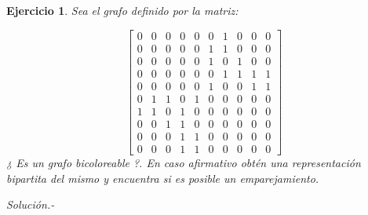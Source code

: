 \documentclass{amsart}
\newtheorem{ejer}[thm]{Ejercicio}
\begin{document}
\begin{ejer}
Sea el grafo definido por la matriz:

$$\left[
\begin{array}{cccccccccc}
0 & 0 & 0 & 0 & 0 & 0 & 1 & 0 & 0 & 0 \\
0 & 0 & 0 & 0 & 0 & 1 & 1 & 0 & 0 & 0 \\
0 & 0 & 0 & 0 & 0 & 1 & 0 & 1 & 0 & 0 \\
0 & 0 & 0 & 0 & 0 & 0 & 1 & 1 & 1 & 1 \\
0 & 0 & 0 & 0 & 0 & 1 & 0 & 0 & 1 & 1 \\
0 & 1 & 1 & 0 & 1 & 0 & 0 & 0 & 0 & 0 \\
1 & 1 & 0 & 1 & 0 & 0 & 0 & 0 & 0 & 0 \\
0 & 0 & 1 & 1 & 0 & 0 & 0 & 0 & 0 & 0 \\
0 & 0 & 0 & 1 & 1 & 0 & 0 & 0 & 0 & 0 \\
0 & 0 & 0 & 1 & 1 & 0 & 0 & 0 & 0 & 0
\end{array}
\right]
$$
¿ Es un grafo bicoloreable ?. En caso afirmativo obtén una representación bipartita del mismo y encuentra si es posible un emparejamiento.

\end{ejer}

{\it Solución.-}





\end{document}
